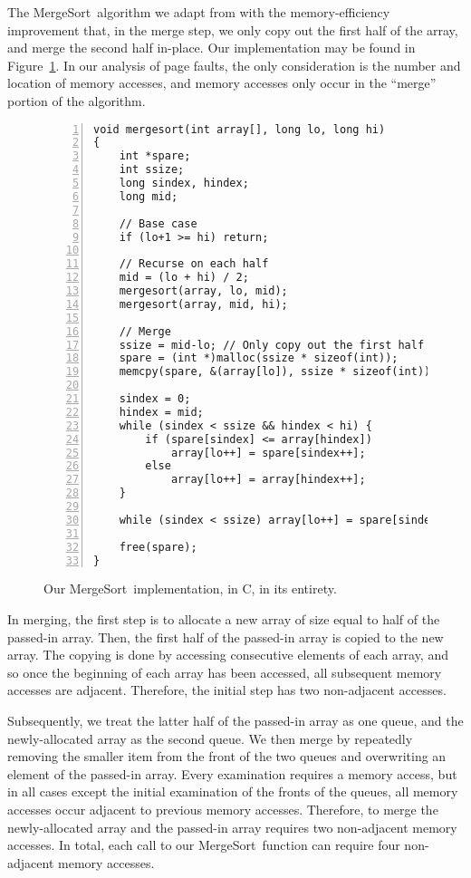 \documentclass[11pt]{article}
\newcommand{\mergesort}{{\sc MergeSort}}
\begin{document}
The \mergesort\ algorithm we adapt from \cite{clrs} with the memory-efficiency
improvement that, in the merge step, we only copy out the first half of the
array, and merge the second half in-place.  Our implementation may be found in
Figure~\ref{fig:msort}.  In our analysis of page faults, the only consideration
is the number and location of memory accesses, and memory accesses only occur
in the ``merge'' portion of the algorithm.

\begin{figure}
{\footnotesize
\begin{Verbatim}[numbers=left,numbersep=3pt,xleftmargin=20pt]
void mergesort(int array[], long lo, long hi)
{
    int *spare;
    int ssize;
    long sindex, hindex;
    long mid;

    // Base case
    if (lo+1 >= hi) return; 

    // Recurse on each half
    mid = (lo + hi) / 2;  
    mergesort(array, lo, mid);
    mergesort(array, mid, hi);

    // Merge
    ssize = mid-lo; // Only copy out the first half
    spare = (int *)malloc(ssize * sizeof(int));
    memcpy(spare, &(array[lo]), ssize * sizeof(int));

    sindex = 0;
    hindex = mid;
    while (sindex < ssize && hindex < hi) {
        if (spare[sindex] <= array[hindex])
            array[lo++] = spare[sindex++];
        else
            array[lo++] = array[hindex++];
    }

    while (sindex < ssize) array[lo++] = spare[sindex++];

    free(spare);
}
\end{Verbatim}
}

\caption{Our \mergesort\ implementation, in C, in its entirety.}
\label{fig:msort}
\end{figure}

In merging, the first step is to allocate a new array of size equal to half of
the passed-in array.  Then, the first half of the passed-in array is copied to
the new array.  The copying is done by accessing consecutive elements of each
array, and so once the beginning of each array has been accessed, all
subsequent memory accesses are adjacent.  Therefore, the initial step has two
non-adjacent accesses.

Subsequently, we treat the latter half of the passed-in array as one queue, and
the newly-allocated array as the second queue.  We then merge by repeatedly
removing the smaller item from the front of the two queues and overwriting an
element of the passed-in array.  Every examination requires a memory access,
but in all cases except the initial examination of the fronts of the queues,
all memory accesses occur adjacent to previous memory accesses.  Therefore, to
merge the newly-allocated array and the passed-in array requires two
non-adjacent memory accesses.  In total, each call to our \mergesort\ function
can require four non-adjacent memory accesses.
\end{document}

